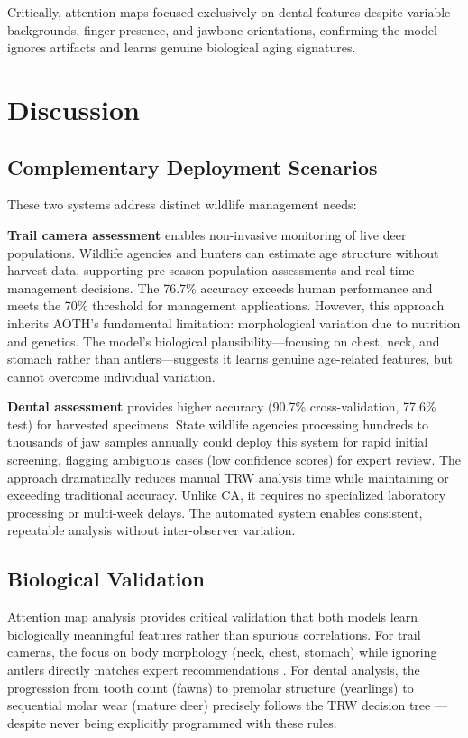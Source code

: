 \documentclass{iopjournal}
\begin{document}
Critically, attention maps focused exclusively on dental features despite variable backgrounds, finger presence, and jawbone orientations, confirming the model ignores artifacts and learns genuine biological aging signatures.

\section{Discussion}

\subsection{Complementary Deployment Scenarios}

These two systems address distinct wildlife management needs:

\textbf{Trail camera assessment} enables non-invasive monitoring of live deer populations. Wildlife agencies and hunters can estimate age structure without harvest data, supporting pre-season population assessments and real-time management decisions. The 76.7\% accuracy exceeds human performance and meets the 70\% threshold for management applications. However, this approach inherits AOTH's fundamental limitation: morphological variation due to nutrition and genetics. The model's biological plausibility—focusing on chest, neck, and stomach rather than antlers—suggests it learns genuine age-related features, but cannot overcome individual variation.

\textbf{Dental assessment} provides higher accuracy (90.7\% cross-validation, 77.6\% test) for harvested specimens. State wildlife agencies processing hundreds to thousands of jaw samples annually could deploy this system for rapid initial screening, flagging ambiguous cases (low confidence scores) for expert review. The approach dramatically reduces manual TRW analysis time while maintaining or exceeding traditional accuracy. Unlike CA, it requires no specialized laboratory processing or multi-week delays. The automated system enables consistent, repeatable analysis without inter-observer variation.

\subsection{Biological Validation}

Attention map analysis provides critical validation that both models learn biologically meaningful features rather than spurious correlations. For trail cameras, the focus on body morphology (neck, chest, stomach) while ignoring antlers directly matches expert recommendations \cite{demarais1999hunter, richards2003observing}. For dental analysis, the progression from tooth count (fawns) to premolar structure (yearlings) to sequential molar wear (mature deer) precisely follows the TRW decision tree \cite{severinghaus1949tooth, larson1980criteria}—despite never being explicitly programmed with these rules.
\end{document}
